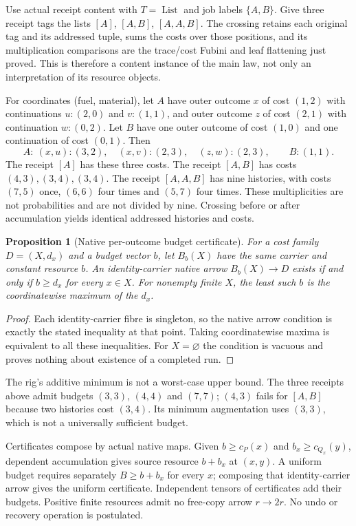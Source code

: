 \documentclass[11pt,a4paper]{article}
\newtheorem{proposition}[theorem]{Proposition}
\theoremstyle{definition}
\newcommand{\List}{\operatorname{List}}
\begin{document}
Use actual receipt content with $T=\List$ and job labels $\{A,B\}$. Give
three receipt tags the lists $[A]$, $[A,B]$, $[A,A,B]$. The crossing retains
each original tag and its addressed tuple, sums the costs over those positions,
and its multiplication comparisons are the trace/cost Fubini and leaf
flattening just proved. This is therefore a content instance of the main law,
not only an interpretation of its resource objects.

For coordinates (fuel, material), let $A$ have outer outcome $x$ of cost
$(1,2)$ with continuations $u:(2,0)$ and $v:(1,1)$, and outer outcome $z$ of
cost $(2,1)$ with continuation $w:(0,2)$. Let $B$ have one outer outcome of
cost $(1,0)$ and one continuation of cost $(0,1)$. Then
\[
 A:\ (x,u):(3,2),\quad(x,v):(2,3),\quad(z,w):(2,3),\qquad B:(1,1).
\]
The receipt $[A]$ has these three costs. The receipt $[A,B]$ has costs
$(4,3),(3,4),(3,4)$. The receipt $[A,A,B]$ has nine histories, with costs
$(7,5)$ once, $(6,6)$ four times and $(5,7)$ four times. These multiplicities
are not probabilities and are not divided by nine. Crossing before or after
accumulation yields identical addressed histories and costs.

\begin{proposition}[Native per-outcome budget certificate]\label{prop:budget}
For a cost family $D=(X,d_x)$ and a budget vector $b$, let $B_b(X)$ have the
same carrier and constant resource $b$. An identity-carrier native arrow
$B_b(X)\to D$ exists if and only if $b\ge d_x$ for every $x\in X$.
For nonempty finite $X$, the least such $b$ is the coordinatewise maximum of
the $d_x$.
\end{proposition}
\begin{proof}
Each identity-carrier fibre is singleton, so the native arrow condition is
exactly the stated inequality at that point. Taking coordinatewise maxima
is equivalent to all these inequalities. For $X=\varnothing$ the condition
is vacuous and proves nothing about existence of a completed run.
\end{proof}
The rig's additive minimum is not a worst-case upper bound. The three receipts
above admit budgets $(3,3)$, $(4,4)$ and $(7,7)$; $(4,3)$ fails for $[A,B]$
because two histories cost $(3,4)$. Its minimum augmentation uses $(3,3)$,
which is not a universally sufficient budget.

Certificates compose by actual native maps. Given $b\ge c_P(x)$ and
$b_x\ge c_{Q_x}(y)$, dependent accumulation gives source resource $b+b_x$
at $(x,y)$. A uniform budget requires separately $B\ge b+b_x$ for every $x$;
composing that identity-carrier arrow gives the uniform certificate.
Independent tensors of certificates add their budgets. Positive finite
resources admit no free-copy arrow $r\to2r$. No undo or recovery operation
is postulated.
\end{document}
